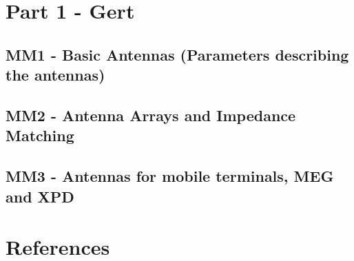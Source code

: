 



    \singlespacing
    \pagestyle{empty}	
	
	\cleardoublepage
	
	\pagestyle{plain}
		
	\tableofcontents 
	\onehalfspacing
	\pagestyle{fancy} %
    \setcounter{page}{0} %

\part{Part 1 - Gert}

\chapter{MM1 - Basic Antennas (Parameters describing the antennas)}





\chapter{MM2 - Antenna Arrays and Impedance Matching}



\chapter{MM3 - Antennas for mobile terminals, MEG and XPD}








\part{References}






